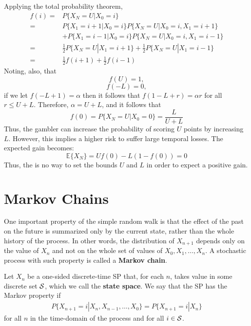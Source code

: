 Applying the total probability theorem,
\begin{align}
f(i) =& P\{X_N = U | X_0 = i\}  \nonumber \\
     =& P\{X_1 = i+1 | X_0 = i\} P\{X_N = U | X_0 = i, X_1 = i+1\}   \nonumber \\
      &+ P\{X_1 = i-1 | X_0 = i\} P\{X_N = U | X_0 = i, X_1 = i-1\}   \nonumber\\
     =& \frac12 P\{X_N = U | X_1 = i+1\} + \frac12 P\{X_N = U | X_1 = i-1\} \nonumber\\
     =& \frac12 f (i+1) + \frac12 f(i-1)
\end{align}
Noting, also, that 
$$f(U)=1,$$
$$f(-L) = 0,$$
if we let $f(-L+1) = \alpha$ then it follows that $f(1-L + r) = \alpha r$ for all $r \le U + L$. Therefore, $\alpha = U + L$, and it follows that 
$$
f(0) = P\{X_N = U | X_0 = 0\} = \frac{L}{U + L}
$$
Thus, the gambler can increase the probability of scoring $U$ points by increasing $L$. However, this implies a higher risk to suffer large temporal losses. The expected gain becomes:
$$
\mathbb{E}\{X_N\} = U f(0) - L (1-f(0)) = 0
$$
Thus, the is no way to set the bounds $U$ and $L$ in order to expect a positive gain.

\newpage


\section{Markov Chains}

One important property of the simple random walk is that the effect of the past on the future is summarized only by the current state, rather than the whole history of the process. In other words, the distribution of $X_{n+1}$ depends only on the value of $X_n$ and not on the whole set of values of $X_0, X_1, \ldots, X_n$. A stochastic process with such property is called a \textbf{Markov chain}.

\begin{definition}
Let $X_n$ be a one-sided discrete-time SP that, for each $n$, takes value in some discrete set ${\cal S}$, which we call  the \textbf{state space}. We say that the SP has the Markov property if
\begin{align}
P\{X_{n+1} = i | X_n, X_{n-1}, \ldots, X_0\} = P\{X_{n+1} = i | X_n\}
\label{SP:markov_property}
\end{align}
for all $n$ in the time-domain of the process and for all $i \in {\cal S}$. 

\end{definition}

